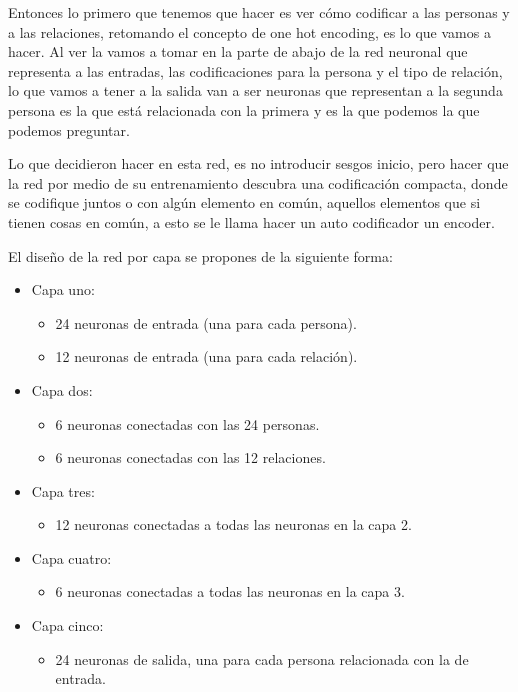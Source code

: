 Entonces lo primero que tenemos que hacer es ver cómo codificar a las personas y a las relaciones, 
retomando el concepto de one hot encoding, es lo que vamos a hacer. Al ver la  vamos a tomar en la parte de abajo de la red neuronal que representa a las entradas, las codificaciones para la persona y el tipo de relación, lo que vamos a tener a la salida van a ser neuronas que representan a la segunda persona es la que está relacionada con la primera y es la que podemos la que podemos preguntar.

Lo que decidieron hacer en esta red, es no introducir sesgos inicio, pero hacer que la red por medio de su entrenamiento descubra una codificación compacta, donde se codifique juntos o con algún elemento en común, aquellos elementos que si tienen cosas en común, a esto se le llama hacer un auto codificador un encoder. 

El diseño de la red por capa se propones de la siguiente forma:

\begin{itemize}
 \item Capa uno:
 \begin{itemize}
  \item 24 neuronas de entrada (una para cada persona).
  \item 12 neuronas de entrada (una para cada relación).
 \end{itemize}
\item Capa dos:
 \begin{itemize}
  \item 6 neuronas conectadas con las 24 personas.
  \item 6 neuronas conectadas con las 12 relaciones.
 \end{itemize}
\item Capa tres:
 \begin{itemize}
  \item 12 neuronas conectadas a todas las neuronas en la capa 2.
 \end{itemize}
\item Capa cuatro:
 \begin{itemize}
  \item 6 neuronas conectadas a todas las neuronas en la capa 3.
 \end{itemize}
\item Capa cinco:
 \begin{itemize}
  \item 24 neuronas de salida, una para cada persona relacionada con la de entrada.
 \end{itemize}

\end{itemize}

